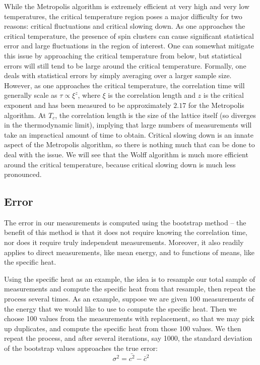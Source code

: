 \documentclass[twocolumn,aps,prl]{revtex4-1} %
\begin{document}
While the Metropolis algorithm is extremely efficient at very high and very low temperatures, the critical temperature region poses a major difficulty for two reasons: critical fluctuations and critical slowing down. As one approaches the critical temperature, the presence of spin clusters can cause significant statistical error and large fluctuations in the region of interest. One can somewhat mitigate this issue by approaching the critical temperature from below, but statistical errors will still tend to be large around the critical temperature. Formally, one deals with statistical errors by simply averaging over a larger sample size. However, as one approaches the critical temperature, the correlation time will generally scale as $\tau \propto \xi^z$, where $\xi$ is the correlation length and $z$ is the critical exponent and has been measured to be approximately $2.17$ for the Metropolis algorithm. At $T_c$, the correlation length is the size of the lattice itself (so diverges in the thermodynamic limit), implying that large numbers of measurements will take an impractical amount of time to obtain. Critical slowing down is an innate aspect of the Metropolis algorithm, so there is nothing much that can be done to deal with the issue. We will see that the Wolff algorithm is much more efficient around the critical temperature, because critical slowing down is much less pronounced.

\subsection{Error}
The error in our measurements is computed using the bootstrap method -- the benefit of this method is that it does not require knowing the correlation time, nor does it require truly independent measurements. Moreover, it also readily applies to direct measurements, like mean energy, and to functions of means, like the specific heat.

Using the specific heat as an example, the idea is to resample our total sample of measurements and compute the specific heat from that resample, then repeat the process several times. As an example, suppose we are given 100 measurements of the energy that we would like to use to compute the specific heat. Then we choose 100 values from the measurements with replacement, so that we may pick up duplicates, and compute the specific heat from those 100 values. We then repeat the process, and after several iterations, say 1000, the standard deviation of the bootstrap values approaches the true error:
\begin{equation}
\sigma^2 = \bar{c^2} - \bar{c}^2
\end{equation}
\end{document}
